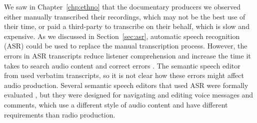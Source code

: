 We saw in Chapter~\ref{chp:ethno} that the documentary producers we observed either manually transcribed their
recordings, which may not be the best use of their time, or paid a third-party to transcribe on their behalf, which is
slow and expensive.  As we discussed in Section~\ref{sec:asr}, automatic speech recognition (ASR) could be used to
replace the manual transcription process. However, the errors in ASR transcripts reduce listener comprehension
\citep{Stark2000,Vemuri2004} and increase the time it takes to search audio content \citep{Ranjan2006} and correct
errors \citep{Burke2006}. The semantic speech editor from \citet{Rubin2013} used verbatim transcripts, so it is not
clear how these errors might affect audio production. Several semantic speech editors that used ASR were formally
evaluated \citep{Whittaker2004,Yoon2014,Sivaraman2016}, but they were designed for navigating and editing voice
messages and comments, which use a different style of audio content and have different requirements than radio
production.









